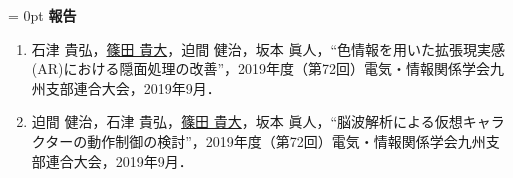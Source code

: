 \vspace{10pt}

\parindent = 0pt
{\Large \bf 報告}
\begin{enumerate}[1.]
     \item 石津 貴弘，\underline{篠田 貴大}，迫間 健治，坂本 眞人，``色情報を用いた拡張現実感(AR)における隠面処理の改善''，2019年度（第72回）電気・情報関係学会九州支部連合大会，2019年9月．
     \item 迫間 健治，石津 貴弘，\underline{篠田 貴大}，坂本 眞人，``脳波解析による仮想キャラクターの動作制御の検討''，2019年度（第72回）電気・情報関係学会九州支部連合大会，2019年9月．   
\end{enumerate}